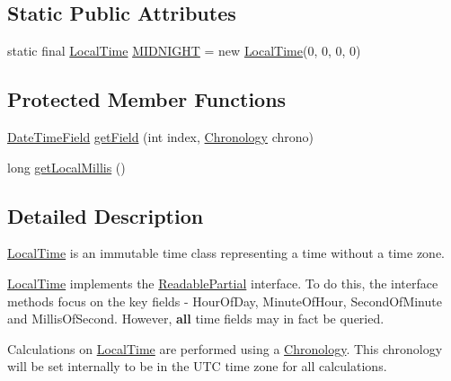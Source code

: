 \subsection*{Static Public Attributes}
\begin{DoxyCompactItemize}
\item 
static final \hyperlink{classorg_1_1joda_1_1time_1_1_local_time}{Local\-Time} \hyperlink{classorg_1_1joda_1_1time_1_1_local_time_a67b32f20b585898140481bbec8673cc1}{M\-I\-D\-N\-I\-G\-H\-T} = new \hyperlink{classorg_1_1joda_1_1time_1_1_local_time}{Local\-Time}(0, 0, 0, 0)
\end{DoxyCompactItemize}
\subsection*{Protected Member Functions}
\begin{DoxyCompactItemize}
\item 
\hyperlink{classorg_1_1joda_1_1time_1_1_date_time_field}{Date\-Time\-Field} \hyperlink{classorg_1_1joda_1_1time_1_1_local_time_a36271f60a08c70b9fc0ca9aa65cd3b6c}{get\-Field} (int index, \hyperlink{classorg_1_1joda_1_1time_1_1_chronology}{Chronology} chrono)
\item 
long \hyperlink{classorg_1_1joda_1_1time_1_1_local_time_a413a33f47a0a0e47baaa8cdb22e22856}{get\-Local\-Millis} ()
\end{DoxyCompactItemize}


\subsection{Detailed Description}
\hyperlink{classorg_1_1joda_1_1time_1_1_local_time}{Local\-Time} is an immutable time class representing a time without a time zone. 

\hyperlink{classorg_1_1joda_1_1time_1_1_local_time}{Local\-Time} implements the \hyperlink{interfaceorg_1_1joda_1_1time_1_1_readable_partial}{Readable\-Partial} interface. To do this, the interface methods focus on the key fields -\/ Hour\-Of\-Day, Minute\-Of\-Hour, Second\-Of\-Minute and Millis\-Of\-Second. However, {\bfseries all} time fields may in fact be queried. 

Calculations on \hyperlink{classorg_1_1joda_1_1time_1_1_local_time}{Local\-Time} are performed using a \hyperlink{classorg_1_1joda_1_1time_1_1_chronology}{Chronology}. This chronology will be set internally to be in the U\-T\-C time zone for all calculations.

